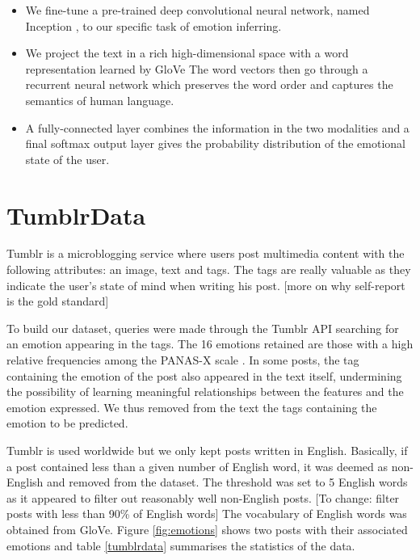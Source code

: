 \documentclass{article} %
\begin{document}
\begin{itemize}
    \item We fine-tune a pre-trained deep convolutional neural network, named Inception \citep{Szegedy-15}, to our specific task of emotion inferring.
    \item We project the text in a rich high-dimensional space with a word representation learned by GloVe \citep{Pennington-14} The word vectors then go through a recurrent neural network which preserves the word order and captures the semantics of human language.
    \item A fully-connected layer combines the information in the two modalities and a final softmax output layer gives the probability distribution of the emotional state of the user.
\end{itemize}


\section{TumblrData}

Tumblr is a microblogging service where users post multimedia content with the following attributes: an image, text and tags. The tags are really valuable as they indicate the user's state of mind when writing his post. [more on why self-report is the gold standard]

To build our dataset, queries were made through the Tumblr API searching for an emotion appearing in the tags. The 16 emotions retained are those with a high relative frequencies among the PANAS-X scale \citep{PANAS-X}. In some posts, the tag containing the emotion of the post also appeared in the text itself, undermining the possibility of learning meaningful relationships between the features and the emotion expressed. We thus removed from the text the tags containing the emotion to be predicted.

Tumblr is used worldwide but we only kept posts written in English. Basically, if a post contained less than a given number of English word, it was deemed as non-English and removed from the dataset. The threshold was set to 5 English words as it appeared to filter out reasonably well non-English posts. [To change: filter posts with less than 90\% of English words] The vocabulary of English words was obtained from GloVe. Figure \ref{fig:emotions} shows two posts with their associated emotions and table \ref{tumblrdata} summarises the statistics of the data.
\end{document}

